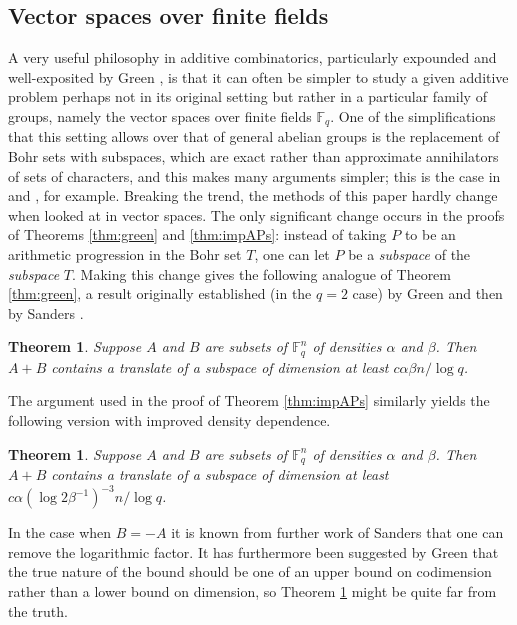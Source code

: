 \documentclass[12pt,a4paper,reqno]{amsart}
\numberwithin{equation}{section}
\theoremstyle{plain}
\newtheorem{theorem}[subsection]{Theorem}
\theoremstyle{definition}
\def\F{\mathbb{F}}
\theoremstyle{plain}
\begin{document}
\subsection*{Vector spaces over finite fields}
A very useful philosophy in additive combinatorics, particularly expounded and well-exposited by Green \cite{green:finite_fields}, is that it can often be simpler to study a given additive problem perhaps not in its original setting but rather in a particular family of groups, namely the vector spaces over finite fields $\F_q$. One of the simplifications that this setting allows over that of general abelian groups is the replacement of Bohr sets with subspaces, which are exact rather than approximate annihilators of sets of characters, and this makes many arguments simpler; this is the case in \cite{green:longAPs} and \cite{sanders:longAPs}, for example. Breaking the trend, the methods of this paper hardly change when looked at in vector spaces. The only significant change occurs in the proofs of Theorems \ref{thm:green} and \ref{thm:impAPs}: instead of taking $P$ to be an arithmetic progression in the Bohr set $T$, one can let $P$ be a \emph{subspace} of the \emph{subspace} $T$. Making this change gives the following analogue of Theorem \ref{thm:green}, a result originally established (in the $q=2$ case) by Green \cite{green:restrictionKakeya} and then by Sanders \cite{sanders:longAPs}.

\begin{theorem}
Suppose $A$ and $B$ are subsets of $\F_q^n$ of densities $\alpha$ and $\beta$. Then $A+B$ contains a translate of a subspace of dimension at least $c \alpha \beta n / \log q$.
\end{theorem}

The argument used in the proof of Theorem \ref{thm:impAPs} similarly yields the following version with improved density dependence.

\begin{theorem}\label{thm:improved_density_Fpn}
Suppose $A$ and $B$ are subsets of $\F_q^n$ of densities $\alpha$ and $\beta$. Then $A+B$ contains a translate of a subspace of dimension at least $c \alpha (\log 2\beta^{-1})^{-3} n / \log q$.
\end{theorem}

In the case when $B=-A$ it is known from further work of Sanders \cite{sanders:GreenHalf} that one can remove the logarithmic factor. It has furthermore been suggested by Green \cite{green:finite_fields} that the true nature of the bound should be one of an upper bound on codimension rather than a lower bound on dimension, so Theorem \ref{thm:improved_density_Fpn} might be quite far from the truth.
\end{document}

